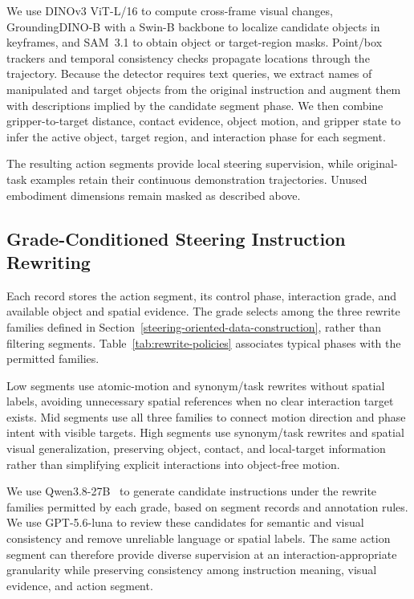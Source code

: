 We use DINOv3 ViT-L/16 to compute cross-frame visual changes,
GroundingDINO-B with a Swin-B backbone to localize candidate objects in
keyframes, and SAM~3.1 to obtain object or target-region masks.
Point/box trackers and temporal consistency checks propagate locations
through the trajectory. Because the detector requires text queries, we
extract names of manipulated and target objects from the original
instruction and augment them with descriptions implied by the candidate
segment phase. We then combine gripper-to-target distance, contact
evidence, object motion, and gripper state to infer the active object,
target region, and interaction phase for each segment.

The resulting action segments provide local steering supervision,
while original-task examples retain their continuous
demonstration trajectories. Unused embodiment dimensions remain masked as
described above.

\hypertarget{grade-conditioned-steering-instruction-rewriting}{%
\subsection{Grade-Conditioned Steering Instruction
Rewriting}\label{grade-conditioned-steering-instruction-rewriting}}

Each record stores the action segment, its control phase, interaction
grade, and available object and spatial evidence. The grade selects among
the three rewrite families defined in Section~\ref{steering-oriented-data-construction},
rather than filtering segments. Table~\ref{tab:rewrite-policies} associates
typical phases with the permitted families.

%

Low segments use atomic-motion and synonym/task rewrites without spatial
labels, avoiding unnecessary spatial references when no clear
interaction target exists. Mid segments use all three families to
connect motion direction and phase intent with visible targets. High
segments use synonym/task rewrites and spatial visual generalization,
preserving object, contact, and local-target information rather than
simplifying explicit interactions into object-free motion.

We use Qwen3.8-27B~\citep{qwen2026qwen3827b} to generate candidate instructions under the rewrite
families permitted by each grade, based on segment records and
annotation rules. We use GPT-5.6-luna to review these candidates for semantic
and visual consistency and remove unreliable language or spatial labels.
The same action segment can
therefore provide diverse supervision at an interaction-appropriate
granularity while preserving consistency among instruction meaning,
visual evidence, and action segment.

